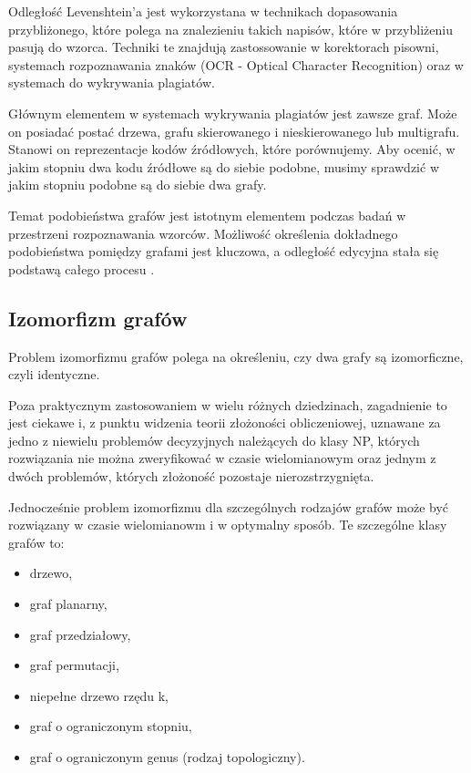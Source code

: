 \documentclass[a4paper,12pt]{article}
\begin{document}
Odległość Levenshtein'a jest wykorzystana w technikach dopasowania przybliżonego, które polega na znalezieniu takich napisów, które w przybliżeniu pasują do wzorca. Techniki te znajdują zastossowanie w korektorach pisowni, systemach rozpoznawania znaków  (OCR - Optical Character Recognition) oraz w systemach do wykrywania plagiatów.

Głównym elementem w systemach wykrywania plagiatów jest zawsze graf. Może on posiadać postać drzewa, grafu skierowanego i nieskierowanego lub multigrafu. Stanowi on reprezentacje kodów źródłowych, które porównujemy. Aby ocenić, w jakim stopniu dwa kodu źródłowe są do siebie podobne, musimy sprawdzić w jakim stopniu podobne są do siebie dwa grafy.

Temat podobieństwa grafów jest istotnym elementem podczas badań w przestrzeni rozpoznawania wzorców. Możliwość określenia dokładnego podobieństwa pomiędzy grafami jest kluczowa, a odległość edycyjna stała się podstawą całego procesu \cite{ged}.

\newpage

\subsection{Izomorfizm grafów}

Problem izomorfizmu grafów polega na określeniu, czy dwa grafy są izomorficzne, czyli identyczne.

Poza praktycznym zastosowaniem w wielu różnych dziedzinach, zagadnienie to jest ciekawe i, z punktu widzenia teorii złożoności obliczeniowej, uznawane za jedno z niewielu problemów decyzyjnych należących do klasy NP, których rozwiązania nie można zweryfikować w czasie wielomianowym oraz jednym z dwóch problemów, których złożoność pozostaje nierozstrzygnięta\cite{np}.

Jednocześnie problem izomorfizmu dla szczególnych rodzajów grafów może być rozwiązany w czasie wielomianowm i w optymalny sposób. Te szczególne klasy grafów to:
\begin{itemize}
\item drzewo\cite{iso_tree},
\item graf planarny\cite{iso_planar},
\item graf przedziałowy\cite{iso_interval},
\item graf permutacji\cite{iso_perm},
\item niepełne drzewo rzędu k\cite{iso_ktree},
\item graf o ograniczonym stopniu\cite{iso_degree},
\item graf o ograniczonym genus (rodzaj topologiczny)\cite{iso_genus}.
\end{itemize}
\end{document}

